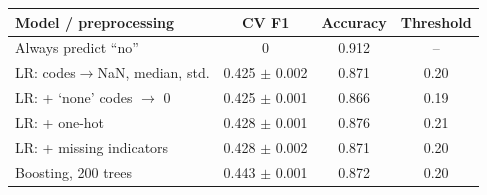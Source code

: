 \begin{tabular}{lccc}
\toprule
Model / preprocessing & CV F1 & Accuracy & Threshold \\
\midrule
Always predict ``no'' & 0 & 0.912 & -- \\
LR: codes$\to$NaN, median, std. & 0.425 $\pm$ 0.002 & 0.871 & 0.20 \\
LR: + `none' codes $\to$ 0 & 0.425 $\pm$ 0.001 & 0.866 & 0.19 \\
LR: + one-hot & 0.428 $\pm$ 0.001 & 0.876 & 0.21 \\
LR: + missing indicators & 0.428 $\pm$ 0.002 & 0.871 & 0.20 \\
Boosting, 200 trees & 0.443 $\pm$ 0.001 & 0.872 & 0.20 \\
\bottomrule
\end{tabular}

